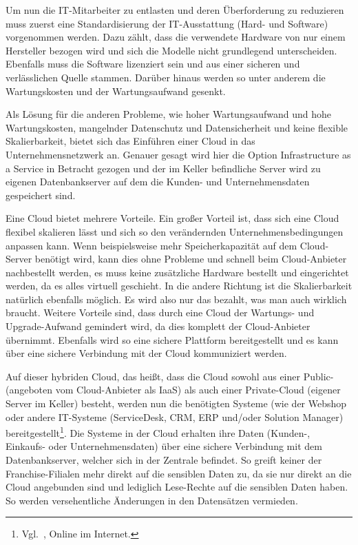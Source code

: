 Um nun die IT-Mitarbeiter zu entlasten und deren Überforderung zu
reduzieren muss zuerst eine Standardisierung der IT-Ausstattung (Hard-
und Software) vorgenommen werden. Dazu zählt, dass die verwendete
Hardware von nur einem Hersteller bezogen wird und sich die Modelle
nicht grundlegend unterscheiden. Ebenfalls muss die Software
lizenziert sein und aus einer sicheren und verlässlichen Quelle
stammen. Darüber hinaus werden so unter anderem die Wartungskosten und
der Wartungsaufwand gesenkt.

Als Lösung für die anderen Probleme, wie hoher Wartungsaufwand und
hohe Wartungskosten, mangelnder Datenschutz und Datensicherheit und
keine flexible Skalierbarkeit, bietet sich das Einführen einer Cloud
in das Unternehmensnetzwerk an. Genauer gesagt wird hier die Option
Infrastructure as a Service in Betracht gezogen und der im Keller
befindliche Server wird zu eigenen Datenbankserver auf dem die Kunden-
und Unternehmensdaten gespeichert sind.

Eine Cloud bietet mehrere Vorteile. Ein großer Vorteil ist, dass sich
eine Cloud flexibel skalieren lässt und sich so den verändernden
Unternehmensbedingungen anpassen kann. Wenn beispielsweise mehr
Speicherkapazität auf dem Cloud-Server benötigt wird, kann dies ohne
Probleme und schnell beim Cloud-Anbieter nachbestellt werden, es muss
keine zusätzliche Hardware bestellt und eingerichtet werden, da es
alles virtuell geschieht. In die andere Richtung ist die
Skalierbarkeit natürlich ebenfalls möglich. Es wird also nur das
bezahlt, was man auch wirklich braucht. Weitere Vorteile sind, dass
durch eine Cloud der Wartungs- und Upgrade-Aufwand gemindert wird, da
dies komplett der Cloud-Anbieter übernimmt. Ebenfalls wird so eine
sichere Plattform bereitgestellt und es kann über eine sichere
Verbindung mit der Cloud kommuniziert werden.

Auf dieser hybriden Cloud, das heißt, dass die Cloud sowohl aus einer
Public- (angeboten vom Cloud-Anbieter als \acrshort{IaaS}) als auch einer
Private-Cloud (eigener Server im Keller) besteht, werden nun die
benötigten Systeme (wie der Webshop oder andere IT-Systeme
(ServiceDesk, CRM, ERP und/oder Solution Manager)
bereitgestellt\footnote{Vgl.~\cite{Hybrid-Cloud}, Online im Internet.}. Die Systeme in der
Cloud erhalten ihre Daten (Kunden-, Einkaufs- oder Unternehmensdaten)
über eine sichere Verbindung mit dem Datenbankserver, welcher sich in
der Zentrale befindet. So greift keiner der Franchise-Filialen mehr
direkt auf die sensiblen Daten zu, da sie nur direkt an die Cloud
angebunden sind und lediglich Lese-Rechte auf die sensiblen Daten
haben. So werden versehentliche Änderungen in den Datensätzen
vermieden.

